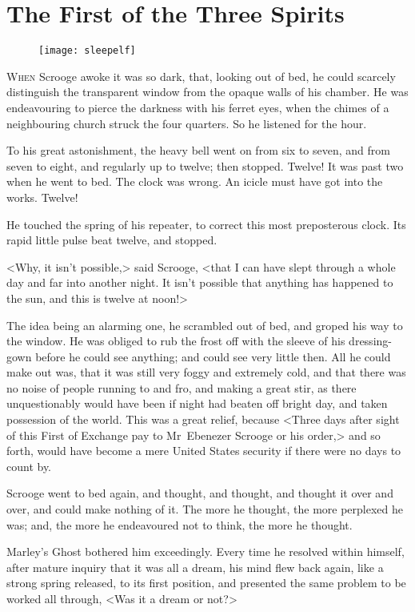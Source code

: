 \chapter{The First of the Three Spirits}
	
\begin{figure}[h]
\centering
\texttt{[image: sleepelf]}
\caption[Headpiece to Stave II]{}
\end{figure}

\lettrine[lines=4]{W}{hen} Scrooge awoke it was so dark, that, looking out of bed, he could scarcely distinguish the transparent window from the opaque walls of his chamber. He was endeavouring to pierce the darkness with his ferret eyes, when the chimes of a neighbouring church struck the four quarters. So he listened for the hour.

To his great astonishment, the heavy bell went on from six to seven, and from seven to eight, and regularly up to twelve; then stopped. Twelve! It was past two when he went to bed. The clock was wrong. An icicle must have got into the works. Twelve!

He touched the spring of his repeater, to correct this most preposterous clock. Its rapid little pulse beat twelve, and stopped.

<Why, it isn't possible,> said Scrooge, <that I can have slept  through a whole day and far into another night. It isn't possible that anything has happened to the sun, and this is twelve at noon!>

The idea being an alarming one, he scrambled out of bed, and groped his way to the window. He was obliged to rub the frost off with the sleeve of his dressing-gown before he could see anything; and could see very little then. All he could make out was, that it was still very foggy and extremely cold, and that there was no noise of people running to and fro, and making a great stir, as there unquestionably would have been if night had beaten off bright day, and taken possession of the world. This was a great relief, because <Three days after sight of this First of Exchange pay to Mr~Ebenezer Scrooge or his order,> and so forth, would have become a mere United States security if there were no days to count by.

Scrooge went to bed again, and thought, and thought, and  thought it over and over, and could make nothing of it. The more he thought, the more perplexed he was; and, the more he endeavoured not to think, the more he thought.

Marley's Ghost bothered him exceedingly. Every time he resolved within himself, after mature inquiry that it was all a dream, his mind flew back again, like a strong spring released, to its first position, and presented the same problem to be worked all  through, <Was it a dream or not?>

